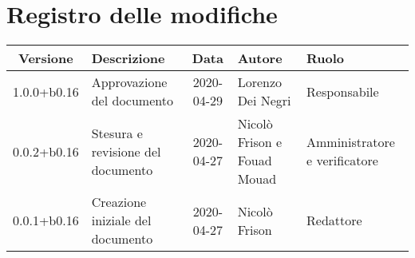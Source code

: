 \section*{Registro delle modifiche}

\begin{center}
	\begin{longtable}{|c|p{3.5cm}|c|p{3cm}|p{3cm}|}
	\hline
	\rowcolor{lighter-grayer}
	\textbf{Versione} & \textbf{Descrizione} & \textbf{Data} & \textbf{Autore} & \textbf{Ruolo} \\
	\hline
	\endfirsthead

	1.0.0+b0.16 & Approvazione del documento & 2020-04-29 & Lorenzo Dei Negri & Responsabile \\
	\hline
	0.0.2+b0.16 & Stesura e revisione del documento & 2020-04-27 & Nicolò Frison e Fouad Mouad & Amministratore e verificatore \\
	\hline
	0.0.1+b0.16 & Creazione iniziale del documento & 2020-04-27 & Nicolò Frison & Redattore \\
	\hline

	\end{longtable}
\end{center}
